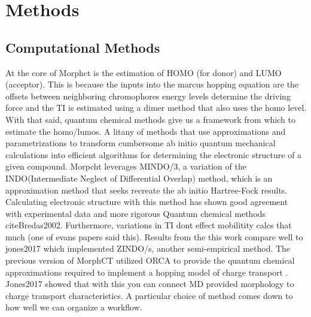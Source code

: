 \chapter{Methods}
\label{chap:methods}


\section{Computational Methods}

At the core of Morphct is the estimation of HOMO (for donor) and LUMO (acceptor). This is because 
the inputs into the marcus hopping equation are the offsets between neighboring  chromophores energy levels
determine the driving force and the TI is estimated using a dimer method that also uses the homo level. 
With that said, quantum chemical methods give us a framework from which to estimate the homo/lumos. A litany of
methods that use approximations and parametrizations to transform cumbersome ab initio quantum mechanical 
calculations into efficient algorithms for determining the electronic structure of a given compound. Morpcht 
leverages MINDO/3, a variation of the INDO(Intermediate Neglect of Differential Overlap) method,
which is an approximation method that seeks recreate the ab initio Hartree-Fock
results\cite{Thiel2014}. Calculating electronic structure with this method has
shown good agreement with experimental data and more rigorous Quantum chemical
methods 
cite{Bredas2002}. Furthermore, variations in TI dont effect mobilitity calcs
that much (one of evans papers said this).  Results
from the this work compare well to jones2017 which implemented ZINDO/s, another
semi-empirical method. The
previous version of MorphCT utilized ORCA to provide the quantum chemical
approximations required to implement
a hopping model of charge transport \cite{Neese2012b}. Jones2017 showed that with this you can connect MD
provided morphology to charge transport characteristics. A particular 
choice of method comes down to how well we can organize a workflow. 

